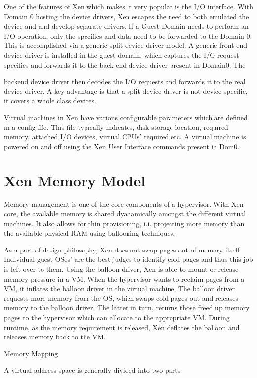 One of the features of Xen which makes it very popular is the I/O interface. With Domain 0 hosting the device drivers, Xen escapes the need to both emulated the device and and develop separate drivers. If a Guest Domain needs to perform an I/O operation, only the specifics and data need to be forwarded to the Domain 0. This is accomplished via a generic split device driver model. A generic front end device driver is installed in the guest domain, which captures the I/O request specifics and forwards it to the back-end device driver present in Domain0. The

backend device driver then decodes the I/O requests and forwards it to the real device driver. A key advantage is that a split device driver is not device specific, it covers a whole class devices.

Virtual machines in Xen have various configurable parameters which are defined in a config file. This file typically indicates, disk storage location, required memory, attached I/O devices, virtual CPUs’ required etc. A virtual machine is powered on and off using the Xen User Interface commands present in Dom0.


\section{Xen Memory Model}

Memory management is one of the core components of a hypervisor. With Xen core, the available memory is shared dyanamically amongst the different virtual machines. It also allows for thin provisioning, i.i. projecting more memory than the available physical RAM using ballooning techniques.

As a part of design philosophy, Xen does not swap pages out of memory itself. Individual guest OSes’ are the best judges to identify cold pages and thus this job is left over to them. Using the balloon driver, Xen is able to mount or release memory pressure in a VM. When the hypervisor wants to reclaim pages from a VM, it inflates the balloon driver in the virtual machine. The balloon driver requests more memory from the OS, which swaps cold pages out and releases memory to the balloon driver. The latter in turn, returns those freed up memory pages to the hypervisor which can allocate to the appropriate VM. During runtime, as the memory requirement is released, Xen deflates the balloon and releases memory back to the VM.

Memory Mapping

A virtual address space is generally divided into two parts

